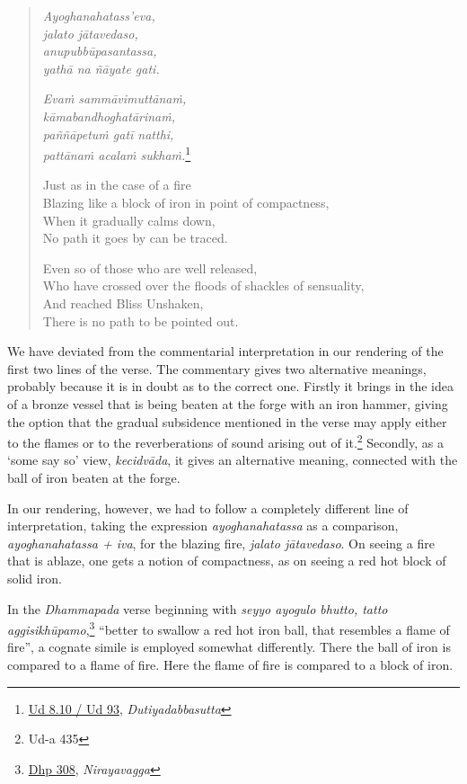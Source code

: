 \begin{quote}
\emph{Ayoghanahatass'eva,}\\
\emph{jalato jātavedaso,}\\
\emph{anupubbūpasantassa,}\\
\emph{yathā na ñāyate gati.}

\emph{Evaṁ sammāvimuttānaṁ,}\\
\emph{kāmabandhoghatārinaṁ,}\\
\emph{paññāpetuṁ gatī natthi,}\\
\emph{pattānaṁ acalaṁ sukhaṁ.}\footnote{\href{https://suttacentral.net/ud8.10/pli/ms}{Ud 8.10 / Ud 93}, \emph{Dutiyadabbasutta}}

Just as in the case of a fire\\
Blazing like a block of iron in point of compactness,\\
When it gradually calms down,\\
No path it goes by can be traced.

Even so of those who are well released,\\
Who have crossed over the floods of shackles of sensuality,\\
And reached Bliss Unshaken,\\
There is no path to be pointed out.
\end{quote}

We have deviated from the commentarial interpretation in our rendering of the first two lines of the verse. The commentary gives two alternative meanings, probably because it is in doubt as to the correct one. Firstly it brings in the idea of a bronze vessel that is being beaten at the forge with an iron hammer, giving the option that the gradual subsidence mentioned in the verse may apply either to the flames or to the reverberations of sound arising out of it.\footnote{Ud-a 435} Secondly, as a `some say so' view, \emph{kecidvāda}, it gives an alternative meaning, connected with the ball of iron beaten at the forge.

In our rendering, however, we had to follow a completely different line of interpretation, taking the expression \emph{ayoghanahatassa} as a comparison, \emph{ayoghanahatassa + iva}, for the blazing fire, \emph{jalato jātavedaso}. On seeing a fire that is ablaze, one gets a notion of compactness, as on seeing a red hot block of solid iron.

In the \emph{Dhammapada} verse beginning with \emph{seyyo ayogulo bhutto, tatto aggisikhūpamo},\footnote{\href{https://suttacentral.net//pli/ms}{Dhp 308}, \emph{Nirayavagga}} ``better to swallow a red hot iron ball, that resembles a flame of fire'', a cognate simile is employed somewhat differently. There the ball of iron is compared to a flame of fire. Here the flame of fire is compared to a block of iron.

